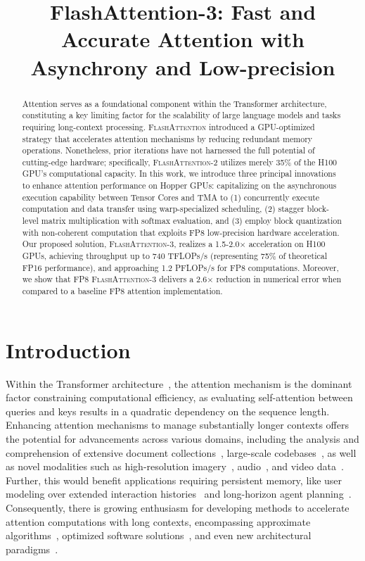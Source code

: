 \title{FlashAttention-3: Fast and Accurate Attention with Asynchrony and Low-precision}

\begin{abstract}
Attention serves as a foundational component within the Transformer architecture, constituting a key limiting factor for the scalability of large language models and tasks requiring long-context processing. \textsc{FlashAttention} introduced a GPU-optimized strategy that accelerates attention mechanisms by reducing redundant memory operations. Nonetheless, prior iterations have not harnessed the full potential of cutting-edge hardware; specifically, \textsc{FlashAttention-2} utilizes merely 35\% of the H100 GPU’s computational capacity. In this work, we introduce three principal innovations to enhance attention performance on Hopper GPUs: capitalizing on the asynchronous execution capability between Tensor Cores and TMA to (1) concurrently execute computation and data transfer using warp-specialized scheduling, (2) stagger block-level matrix multiplication with softmax evaluation, and (3) employ block quantization with non-coherent computation that exploits FP8 low-precision hardware acceleration. Our proposed solution, \textsc{FlashAttention-3}, realizes a 1.5-2.0$\times$ acceleration on H100 GPUs, achieving throughput up to 740 TFLOPs/s (representing 75\% of theoretical FP16 performance), and approaching 1.2 PFLOPs/s for FP8 computations. Moreover, we show that FP8 \textsc{FlashAttention-3} delivers a 2.6$\times$ reduction in numerical error when compared to a baseline FP8 attention implementation.
\end{abstract}

\section{Introduction}
\label{sec:intro}

Within the Transformer architecture~\citep{vaswani2017attention}, the attention mechanism is the dominant factor constraining computational efficiency, as evaluating self-attention between queries and keys results in a quadratic dependency on the sequence length. Enhancing attention mechanisms to manage substantially longer contexts offers the potential for advancements across various domains, including the analysis and comprehension of extensive document collections~\citep{guo2021longt5,shaham2022scrolls,peng2023yarn}, large-scale codebases~\citep{roziere2023code, li2023starcoder}, as well as novel modalities such as high-resolution imagery~\citep{chen2022scaling}, audio~\citep{gulati2020conformer}, and video data~\citep{ho2022video}. Further, this would benefit applications requiring persistent memory, like user modeling over extended interaction histories~\citep{sun2019bert4rec} and long-horizon agent planning~\citep{yao2022react}. Consequently, there is growing enthusiasm for developing methods to accelerate attention computations with long contexts, encompassing approximate algorithms~\citep{katharopoulos2020transformers,choromanski2020rethinking, tay2020efficient}, optimized software solutions~\citep{rabe2021self,dao2022flashattention,kwon2023efficient}, and even new architectural paradigms~\citep{peng2023rwkv,sun2023retentive,gu2023mamba}.

